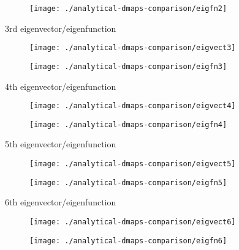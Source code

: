 \documentclass[11pt]{article}
\begin{document}
\begin{figure}[htbp]
  \centering
  \texttt{[image: ./analytical-dmaps-comparison/eigfn2]}
\end{figure}

\clearpage

3rd eigenvector/eigenfunction

\begin{figure}[htbp]
  \centering
  \texttt{[image: ./analytical-dmaps-comparison/eigvect3]}
\end{figure}

\begin{figure}[htbp]
  \centering
  \texttt{[image: ./analytical-dmaps-comparison/eigfn3]}
\end{figure}

\clearpage

4th eigenvector/eigenfunction

\begin{figure}[htbp]
  \centering
  \texttt{[image: ./analytical-dmaps-comparison/eigvect4]}
\end{figure}

\begin{figure}[htbp]
  \centering
  \texttt{[image: ./analytical-dmaps-comparison/eigfn4]}
\end{figure}

\clearpage

5th eigenvector/eigenfunction

\begin{figure}[htbp]
  \centering
  \texttt{[image: ./analytical-dmaps-comparison/eigvect5]}
\end{figure}

\begin{figure}[htbp]
  \centering
  \texttt{[image: ./analytical-dmaps-comparison/eigfn5]}
\end{figure}

\clearpage

6th eigenvector/eigenfunction

\begin{figure}[htbp]
  \centering
  \texttt{[image: ./analytical-dmaps-comparison/eigvect6]}
\end{figure}

\begin{figure}[htbp]
  \centering
  \texttt{[image: ./analytical-dmaps-comparison/eigfn6]}
\end{figure}
\end{document}
